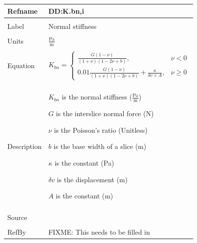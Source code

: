\documentclass[12pt]{article}
\begin{document}
\noindent \begin{minipage}{\textwidth}
\begin{tabular}{p{} p{}}
\toprule \textbf{Refname} & \textbf{DD:K.bn,i}
\label{DD:K.bn,i}
\\ \midrule \\
Label & Normal stiffness
\\ \midrule \\
Units & $\frac{\text{Pa}}{\text{m}}$
\\ \midrule \\
Equation & \begin{dmath}
           {K_{bn}}=\begin{cases}
\frac{G \left(1-ν\right)}{\left(1+ν\right) \left(1-2 ν+b\right)}, & ν<0\\
0.01 \frac{G \left(1-ν\right)}{\left(1+ν\right) \left(1-2 ν+b\right)}+\frac{κ}{δv+A}, & ν\geq{}0
\end{cases}
	   \end{dmath}
\\ \midrule \\
Description & \begin{symbDescription}
              \item{${K_{bn}}$ is the normal stiffness ($\frac{\text{Pa}}{\text{m}}$)}
              \item{$G$ is the interslice normal force (N)}
              \item{$ν$ is the Poisson's ratio (Unitless)}
              \item{$b$ is the base width of a slice (m)}
              \item{$κ$ is the constant (Pa)}
              \item{$δv$ is the displacement (m)}
              \item{$A$ is the constant (m)}
              \end{symbDescription}
\\ \midrule \\
Source &
\\ \midrule \\
RefBy & FIXME: This needs to be filled in
\\ \bottomrule \end{tabular}
\end{minipage}\\
~\newline
\end{document}
